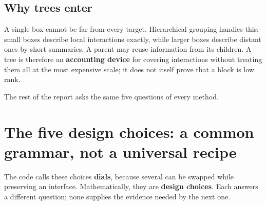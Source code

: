 \subsection{Why trees enter}
A single box cannot be far from every target. Hierarchical grouping handles this: small boxes describe local interactions exactly, while larger boxes describe distant ones by short summaries. A parent may reuse information from its children. A tree is therefore an \textbf{accounting device} for covering interactions without treating them all at the most expensive scale; it does not itself prove that a block is low rank.

The rest of the report asks the same five questions of every method.

\section{The five design choices: a common grammar, not a universal recipe}
\label{sec:dials}

\begin{center}
\end{center}

The code calls these choices \textbf{dials}, because several can be swapped while preserving an interface. Mathematically, they are \textbf{design choices}. Each answers a different question; none supplies the evidence needed by the next one.

